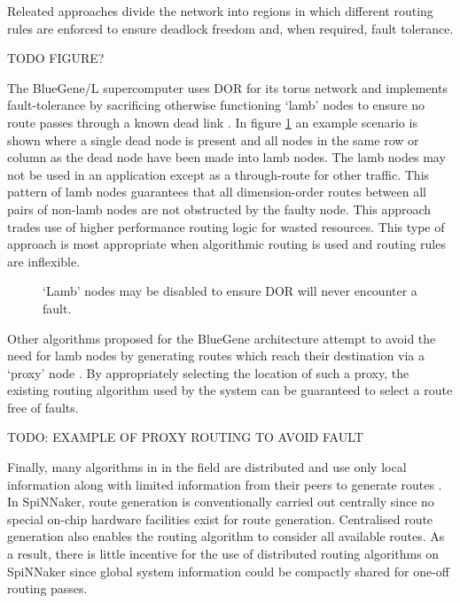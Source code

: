 			Releated approaches \cite{mejia06,boppana95} divide the network into
			regions in which different routing rules are enforced to ensure deadlock
			freedom and, when required, fault tolerance.
			
			TODO FIGURE?
			
			The BlueGene/L supercomputer \cite{adiga02} uses DOR for its torus
			network and implements fault-tolerance by sacrificing otherwise
			functioning `lamb' nodes to ensure no route passes through a known dead
			link \cite{ho04}. In figure \ref{fig:lamb-nodes} an example scenario is
			shown where a single dead node is present and all nodes in the same row
			or column as the dead node have been made into lamb nodes. The lamb nodes
			may not be used in an application except as a through-route for other
			traffic. This pattern of lamb nodes guarantees that all dimension-order
			routes between all pairs of non-lamb nodes are not obstructed by the
			faulty node. This approach trades use of higher performance routing
			logic for wasted resources. This type of approach is most appropriate
			when algorithmic routing is used and routing rules are inflexible.
			
			\begin{figure}
				\center
				
				\caption{`Lamb' nodes may be disabled to ensure DOR will never
				encounter a fault.}
				\label{fig:lamb-nodes}
			\end{figure}
			
			Other algorithms proposed for the BlueGene architecture attempt to avoid
			the need for lamb nodes by generating routes which reach their destination
			via a `proxy' node \cite{gomez04}. By appropriately selecting the location
			of such a proxy, the existing routing algorithm used by the system can be
			guaranteed to select a route free of faults.
			
			TODO: EXAMPLE OF PROXY ROUTING TO AVOID FAULT
			
			Finally, many algorithms in in the field are distributed and use only local
			information along with limited information from their peers to generate
			routes \cite{fick09b}. In SpiNNaker, route generation is conventionally
			carried out centrally since no special on-chip hardware facilities exist
			for route generation. Centralised route generation also enables the routing
			algorithm to consider all available routes. As a result, there is little
			incentive for the use of distributed routing algorithms on SpiNNaker since
			global system information could be compactly shared for one-off routing
			passes.
			
